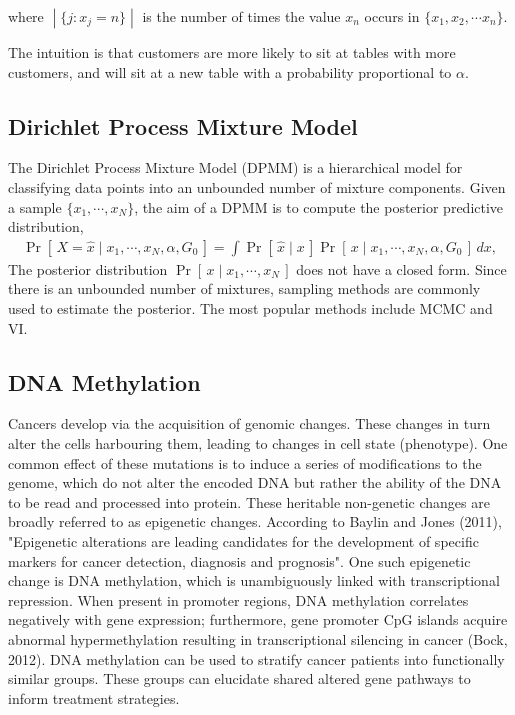 \documentclass{article}
\newcommand{\prob}[1]{\operatorname{Pr}\left[\,#1\,\right]}
\def\cond{\; | \;}
\begin{document}
where $\cond \{j: x_j = n\}\cond$ is the number of times the value $x_n$ occurs in $\{x_1, x_2, \cdots x_n\}$.


The intuition is that customers are more likely to sit at tables with more customers, and will sit at a new table with a probability proportional to $\alpha$.\\


\subsection{Dirichlet Process Mixture Model}
The Dirichlet Process Mixture Model (DPMM) is a hierarchical model for classifying data points into an unbounded number of mixture components.  Given a sample $\{x_1, \cdots, x_N\}$, the aim of a DPMM is to compute the posterior predictive distribution, 
\begin{align*}
\prob{X = \hat{x}\cond x_1, \cdots, x_N, \alpha, G_0} = \int\prob{\hat{x}\cond x}\prob{x\cond x_1, \cdots, x_N, \alpha, G_0}\,dx,
\end{align*}
The posterior distribution $\prob{x\cond x_1, \cdots, x_N}$ does not have a closed form. Since there is an unbounded number of mixtures, sampling methods are commonly used to estimate the posterior. The most popular methods include MCMC and VI.



\subsection{DNA Methylation}

Cancers develop via the acquisition of genomic changes. These changes in turn alter the cells harbouring them, leading to changes in cell state (phenotype). One common effect of these mutations is to induce a series of modifications to the genome, which do not alter the encoded DNA but rather the ability of the DNA to be read and processed into protein. These heritable non-genetic changes are broadly referred to as epigenetic changes. According to Baylin and Jones (2011), "Epigenetic alterations are leading candidates for the development of specific markers for cancer detection, diagnosis and prognosis". One such epigenetic change is DNA methylation, which is unambiguously linked with transcriptional repression. When present in promoter regions, DNA methylation correlates negatively with gene expression; furthermore, gene promoter CpG islands acquire abnormal hypermethylation resulting in transcriptional silencing in cancer (Bock, 2012). DNA methylation can be used to stratify cancer patients into functionally similar groups. These groups can elucidate shared altered gene pathways to inform treatment strategies.
\end{document}
